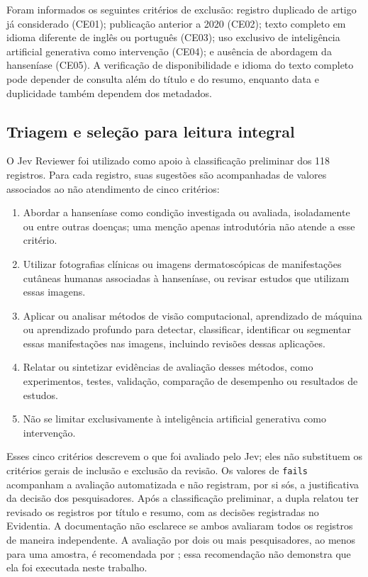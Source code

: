 Foram informados os seguintes critérios de exclusão: registro duplicado de
artigo já considerado (CE01); publicação anterior a 2020 (CE02); texto
completo em idioma diferente de inglês ou português (CE03); uso exclusivo
de inteligência artificial generativa como intervenção (CE04); e ausência
de abordagem da hanseníase (CE05). A verificação de disponibilidade e
idioma do texto completo pode depender de consulta além do título e do
resumo, enquanto data e duplicidade também dependem dos metadados.

\subsection{Triagem e seleção para leitura integral}

O Jev Reviewer foi utilizado como apoio à classificação preliminar dos
118 registros. Para cada registro, suas sugestões são acompanhadas de
valores associados ao não atendimento de cinco critérios:
\begin{enumerate}
\item Abordar a hanseníase como condição investigada ou avaliada,
isoladamente ou entre outras doenças; uma menção apenas introdutória não
atende a esse critério.
\item Utilizar fotografias clínicas ou imagens dermatoscópicas de
manifestações cutâneas humanas associadas à hanseníase, ou revisar estudos
que utilizam essas imagens.
\item Aplicar ou analisar métodos de visão computacional, aprendizado de
máquina ou aprendizado profundo para detectar, classificar, identificar
ou segmentar essas manifestações nas imagens, incluindo revisões dessas
aplicações.
\item Relatar ou sintetizar evidências de avaliação desses métodos, como
experimentos, testes, validação, comparação de desempenho ou resultados
de estudos.
\item Não se limitar exclusivamente à inteligência artificial generativa
como intervenção.
\end{enumerate}

Esses cinco critérios descrevem o que foi avaliado pelo Jev; eles não
substituem os critérios gerais de inclusão e exclusão da revisão. Os valores
de \texttt{fails} acompanham a avaliação automatizada e não registram, por
si sós, a justificativa da decisão dos pesquisadores. Após a classificação
preliminar, a dupla relatou ter revisado os registros por título e resumo,
com as decisões registradas no Evidentia. A documentação não esclarece se
ambos avaliaram todos os registros de maneira independente. A avaliação por
dois ou mais pesquisadores, ao menos para uma amostra, é recomendada por
; essa recomendação não demonstra que ela
foi executada neste trabalho.

